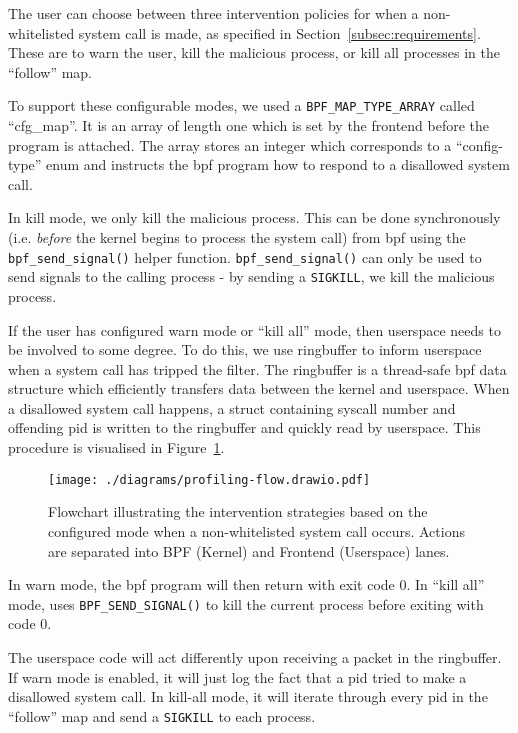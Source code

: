 The user can choose between three intervention policies for when a
non-whitelisted system call is made, as specified in 
Section~\ref{subsec:requirements}. These are to warn the user, kill the
malicious process, or kill all processes in the ``follow'' map.

To support these configurable modes, we used a \texttt{BPF\_MAP\_TYPE\_ARRAY}
called ``cfg\_map''. It is an array of length one which is set by the frontend
before the program is attached. The array stores an integer which corresponds to
a ``config-type'' enum and instructs the \ac{bpf} program how to respond to a
disallowed system call.

In kill mode, we only kill the malicious process. This can be done synchronously
(i.e. \textit{before} the kernel begins to process the system call) from \ac{bpf}
using the \texttt{bpf\_send\_signal()} helper function. 
\texttt{bpf\_send\_signal()} can only be used to send signals to the calling
process - by sending a \texttt{SIGKILL}, we kill the malicious process.

If the user has configured warn mode or ``kill all'' mode, then userspace needs
to be involved to some degree. To do this, we use  ringbuffer to inform
userspace when a system call has tripped the filter. The ringbuffer is a thread-safe
\ac{bpf} data structure which efficiently transfers data between the kernel and
userspace. When a disallowed system call happens, a struct containing syscall
number and offending \ac{pid} is written to the ringbuffer and quickly read by
userspace. This procedure is visualised in Figure~\ref{fig:intervention-flowchart}.

\begin{figure}[h]
\centering
\texttt{[image: ./diagrams/profiling-flow.drawio.pdf]} 
\caption{Flowchart illustrating the intervention strategies based on the configured mode when a non-whitelisted system call occurs. Actions are separated into BPF (Kernel) and Frontend (Userspace) lanes.}
\label{fig:intervention-flowchart}
\end{figure}

In warn mode, the \ac{bpf} program will then return with exit code 0. In ``kill
all'' mode, \af uses \texttt{BPF\_SEND\_SIGNAL()} to kill the current process
before exiting with code 0.

The userspace code will act differently upon receiving a packet in the
ringbuffer. If warn mode is enabled, it will just log the fact that a \ac{pid}
tried to make a disallowed system call. In kill-all mode, it will iterate through
every \ac{pid} in the ``follow'' map and send a \texttt{SIGKILL} to each
process.

